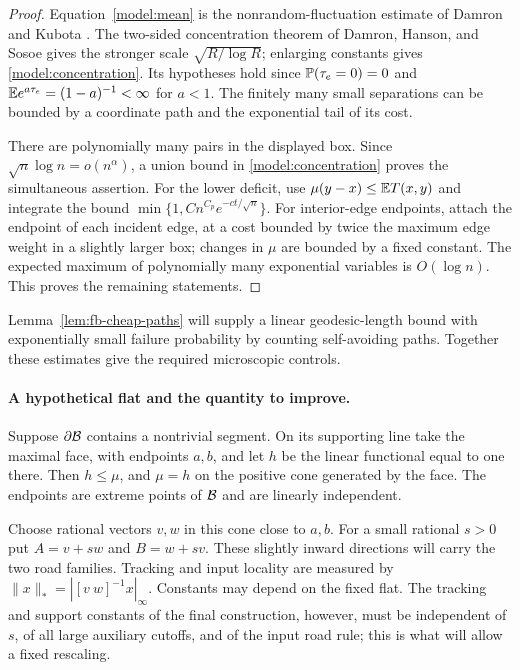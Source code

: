 \begin{proof}
Equation~\eqref{model:mean} is the nonrandom-fluctuation estimate of
Damron and Kubota \cite[Proposition~1.1]{DK2016}. The two-sided
concentration theorem of Damron, Hanson, and Sosoe
\cite[Theorem~1.1]{DHS2014} gives the stronger scale
$\sqrt{R/\log R}$; enlarging constants gives
\eqref{model:concentration}. Its hypotheses hold since
$\mathbb P(\tau_e=0)=0$ and $\mathbb E e^{a\tau_e}=(1-a)^{-1}<\infty$ for $a<1$.
The finitely many small separations can be bounded by a coordinate
path and the exponential tail of its cost.

There are polynomially many pairs in the displayed box. Since
$\sqrt n\log n=o(n^\alpha)$, a union bound in
\eqref{model:concentration} proves the simultaneous assertion.
For the lower deficit, use $\mu(y-x)\le\mathbb E T(x,y)$ and integrate
the bound $\min\{1,C n^{C_p}e^{-ct/\sqrt n}\}$.
For interior-edge endpoints, attach the endpoint of each incident
edge, at a cost bounded by twice the maximum edge weight in a
slightly larger box; changes in $\mu$ are bounded by a fixed constant.
The expected maximum of polynomially many exponential variables is
$O(\log n)$. This proves the remaining statements.
\end{proof}

Lemma~\ref{lem:fb-cheap-paths} will supply a linear geodesic-length bound
with exponentially small failure probability by counting self-avoiding
paths. Together these estimates give the required microscopic controls.

\paragraph{A hypothetical flat and the quantity to improve.}
Suppose $\partial\mathcal B$ contains a nontrivial segment. On its supporting
line take the maximal face, with endpoints $a,b$, and let $h$ be the
linear functional equal to one there. Then $h\le\mu$, and $\mu=h$ on
the positive cone generated by the face. The endpoints are extreme
points of $\mathcal B$ and are linearly independent.

Choose rational vectors $v,w$ in this cone close to $a,b$. For a small
rational $s>0$ put $A=v+sw$ and $B=w+sv$. These slightly inward
directions will carry the two road families. Tracking and input
locality are measured by
$\|x\|_*=|[v\ w]^{-1}x|_\infty$. Constants may depend on the fixed
flat. The tracking and support constants of the final construction,
however, must be independent of $s$, of all large auxiliary cutoffs,
and of the input road rule; this is what will allow a fixed rescaling.

